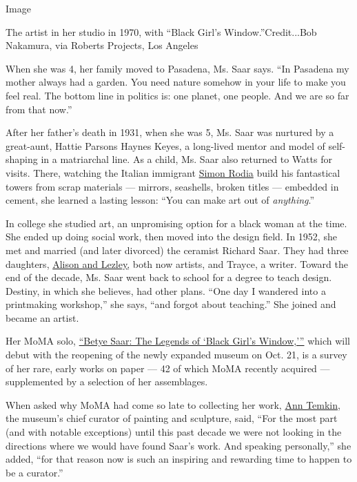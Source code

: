 Image

The artist in her studio in 1970, with ``Black Girl's
Window.''Credit...Bob Nakamura, via Roberts Projects, Los Angeles

When she was 4, her family moved to Pasadena, Ms. Saar says. ``In
Pasadena my mother always had a garden. You need nature somehow in your
life to make you feel real. The bottom line in politics is: one planet,
one people. And we are so far from that now.''

After her father's death in 1931, when she was 5, Ms. Saar was nurtured
by a great-aunt, Hattie Parsons Haynes Keyes, a long-lived mentor and
model of self-shaping in a matriarchal line. As a child, Ms. Saar also
returned to Watts for visits. There, watching the Italian immigrant
\href{https://tclf.org/pioneer/sabato-simon-rodia}{}
\href{https://tclf.org/pioneer/sabato-simon-rodia}{Simon Rodia} build
his fantastical towers from scrap materials --- mirrors, seashells,
broken titles --- embedded in cement, she learned a lasting lesson:
``You can make art out of \emph{anything}.''

In college she studied art, an unpromising option for a black woman at
the time. She ended up doing social work, then moved into the design
field. In 1952, she met and married (and later divorced) the ceramist
Richard Saar. They had three daughters,
\href{https://www.amazon.com/Family-Legacies-Betye-Lezley-Alison/dp/029598564X}{Alison
and Lezley,} both now artists, and Trayce, a writer. Toward the end of
the decade, Ms. Saar went back to school for a degree to teach design.
Destiny, in which she believes, had other plans. ``One day I wandered
into a printmaking workshop,'' she says, ``and forgot about teaching.''
She joined and became an artist.

Her MoMA solo,
\href{https://www.moma.org/calendar/exhibitions/5060}{``Betye Saar: The
Legends of `Black Girl's Window,'''} which will debut with the reopening
of the newly expanded museum on Oct. 21, is a survey of her rare, early
works on paper --- 42 of which MoMA recently acquired --- supplemented
by a selection of her assemblages.

When asked why MoMA had come so late to collecting her work,
\href{https://www.moma.org/about/senior-staff/ann-temkin}{Ann Temkin},
the museum's chief curator of painting and sculpture, said, ``For the
most part (and with notable exceptions) until this past decade we were
not looking in the directions where we would have found Saar's work. And
speaking personally,'' she added, ``for that reason now is such an
inspiring and rewarding time to happen to be a curator.''

